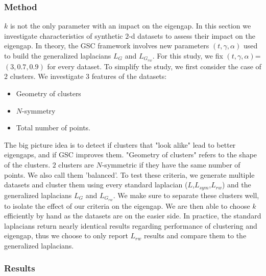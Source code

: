 \documentclass[a4paper,12pt]{article}
\theoremstyle{definition}
\theoremstyle{plain}
\begin{document}
\subsubsection{Method}
$k$ is not the only parameter with an impact on the eigengap. In this section we investigate characteristics of synthetic $2$-d datasets to assess their impact on the eigengap. In theory, the GSC framework involves new parameters $(t,\gamma,\alpha)$ used to build the generalized laplacians $L_{G}$ and $L_{G_{rw}}$. For this study, we fix $(t,\gamma,\alpha)$=$(3,0.7,0.9)$ for every dataset. To simplify the study, we first consider the case of $2$ clusters. We investigate $3$ features of the datasets:
\begin{itemize}
	\item Geometry of clusters
	\item $N$-symmetry
	\item Total number of points.
\end{itemize}
The big picture idea is to detect if clusters that "look alike" lead to better eigengaps, and if GSC improves them.
"Geometry of clusters" refers to the shape of the clusters. $2$ clusters are $N$-symmetric if they have the same number of points. We also call them 'balanced'.
To test these criteria, we generate multiple datasets and cluster them using every standard laplacian ($L$,$L_{sym}$,$L_{rw}$) and the generalized laplacians $L_G$ and $L_{G_{rw}}$. We make sure to separate these clusters well, to isolate the effect of our criteria on the eigengap. We are then able to choose $k$ efficiently by hand as the datasets are on the easier side. In practice, the standard laplacians return nearly identical results regarding performance of clustering and eigengap, thus we choose to only report $L_{rw}$ results and compare them to the generalized laplacians.
\subsubsection{Results}
\end{document}

